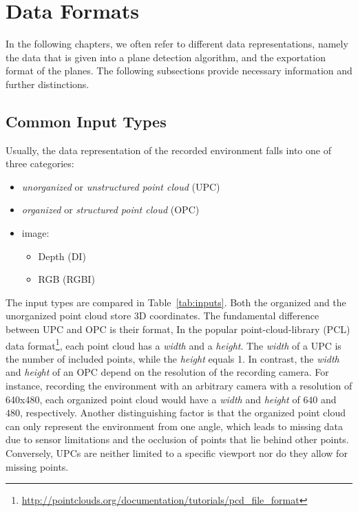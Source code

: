 \documentclass[main.tex]{subfiles}
\begin{document}
\section{Data Formats}
\label{sec:dataformats}
In the following chapters, we often refer to different data representations, namely the data that is given into a plane detection algorithm, and
the exportation format of the planes. The following subsections provide necessary information and further distinctions.


\subsection{Common Input Types}
\label{subsec:input}
Usually, the data representation of the recorded environment falls into one of three categories:
\begin{itemize}
    \item \textit{unorganized} or \textit{unstructured point cloud} (UPC)
    \item \textit{organized} or \textit{structured point cloud} (OPC)
    \item image:
          \begin{itemize}
              \item Depth (DI)
              \item RGB (RGBI)
          \end{itemize}
\end{itemize}

The input types are compared in Table~\ref{tab:inputs}. Both the organized and the unorganized point cloud store 3D coordinates.
The fundamental difference between UPC and OPC is their format,
In the popular point-cloud-library (PCL) data format\footnote{\href{http://pointclouds.org/documentation/tutorials/pcd\_file\_format}{http://pointclouds.org/documentation/tutorials/pcd\_file\_format}},
each point cloud has a \textit{width} and a \textit{height}.
The \textit{width} of a UPC is the number of included points, while the \textit{height} equals 1.
In contrast, the \textit{width} and \textit{height} of an OPC depend on the resolution of the recording camera.
For instance, recording the environment with an arbitrary camera with a resolution of 640x480, each organized point cloud
would have a \textit{width} and \textit{height} of $640$ and $480$, respectively. Another distinguishing factor is that the organized
point cloud can only represent the environment from one angle, which leads to missing data due to sensor limitations and the occlusion
of points that lie behind other points. Conversely, UPCs are neither limited to a specific viewport nor do they allow for missing points.
\end{document}
